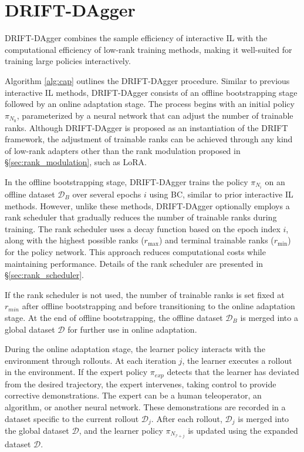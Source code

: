 
\section{DRIFT-DAgger}
\label{sec:drift_dagger}

DRIFT-DAgger combines the sample efficiency of interactive IL with the computational efficiency of low-rank training methods, making it well-suited for training large policies interactively.

Algorithm \ref{alg:cap} outlines the DRIFT-DAgger procedure. Similar to previous interactive IL methods, DRIFT-DAgger consists of an offline bootstrapping stage followed by an online adaptation stage. The process begins with an initial policy $\pi_{N_0}$, parameterized by a neural network that can adjust the number of trainable ranks. Although DRIFT-DAgger is proposed as an instantiation of the DRIFT framework, the adjustment of trainable ranks can be achieved through any kind of low-rank adapters other than the rank modulation proposed in \S\ref{sec:rank_modulation}, such as LoRA.

In the offline bootstrapping stage, DRIFT-DAgger trains the policy $\pi_{N_i}$ on an offline dataset $\mathcal{D}_B$ over several epochs $i$ using BC, similar to prior interactive IL methods. However, unlike these methods, DRIFT-DAgger optionally employs a rank scheduler that gradually reduces the number of trainable ranks during training. The rank scheduler uses a decay function based on the epoch index $i$, along with the highest possible ranks ($r_{\text{max}}$) and terminal trainable ranks ($r_{\text{min}}$) for the policy network. This approach reduces computational costs while maintaining performance. Details of the rank scheduler are presented in \S\ref{sec:rank_scheduler}.

If the rank scheduler is not used, the number of trainable ranks is set fixed at $r_{min}$ after offline bootstrapping and before transitioning to the online adaptation stage. At the end of offline bootstrapping, the offline dataset $\mathcal{D}_B$ is merged into a global dataset $\mathcal{D}$ for further use in online adaptation.

During the online adaptation stage, the learner policy interacts with the environment through rollouts. At each iteration $j$, the learner executes a rollout in the environment. If the expert policy $\pi_{exp}$ detects that the learner has deviated from the desired trajectory, the expert intervenes, taking control to provide corrective demonstrations. The expert can be a human teleoperator, an algorithm, or another neural network. These demonstrations are recorded in a dataset specific to the current rollout $\mathcal{D}_j$. After each rollout, $\mathcal{D}_j$ is merged into the global dataset $\mathcal{D}$, and the learner policy $\pi_{N_{\mathcal{I}+j}}$ is updated using the expanded dataset $\mathcal{D}$.

